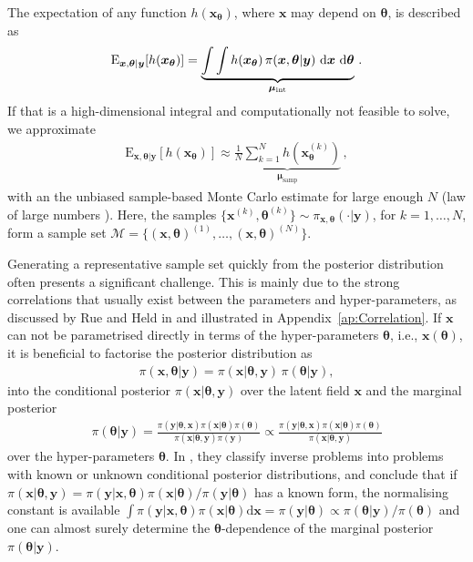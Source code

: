 The expectation of any function $h(\bm{x}_{\bm{\theta}})$, where $\bm{x}$ may depend on $\bm{\theta}$, is described as 
\begin{align}
	\text{E}_{\bm{x},\bm{\theta}|\bm{y}} [h(\bm{x}_{\bm{\theta}})] =  \underbrace{\int \int   h(\bm{x}_{\bm{\theta}}) \,  \pi(\bm{x}, \bm{\theta} | \bm{y} ) \, \mathop{}\!\mathrm{d} \bm{x}  \, \mathop{}\!\mathrm{d} \bm{\theta}}_{\bm{\mu}_{\text{int}}}   \label{eq:expPos} \, .
\end{align}
If that is a high-dimensional integral and computationally not feasible to solve, we approximate 
\begin{align}
	\label{eq:sampMean}
	\text{E}_{\bm{x},\bm{\theta}|\bm{y}} [h(\bm{x}_{\bm{\theta}})] \approx \underbrace{ \frac{1}{N} \sum_{k=1}^{N} h(\bm{x}^{(k)}_{\bm{\theta}})  }_{\bm{\mu}_{\text{samp}}} \, ,
\end{align}
with an the unbiased sample-based Monte Carlo estimate \cite{roberts2004general} for large enough $N$ (law of large numbers \cite[Chapter 17]{tweedie2009measprob}).
Here, the samples $\{\bm{x}^{(k)},\bm{\theta}^{(k)} \}\sim \pi_{\bm{x}, \bm{\theta}}(\cdot|\bm{y})$, for $k = 1, \dots, N$, form a sample set $\mathcal{M} =\{ (\bm{x},\bm{\theta})^{(1)}, \dots ,  (\bm{x},\bm{\theta})^{(N)} \}$.

Generating a representative sample set quickly from the posterior distribution often presents a significant challenge. This is mainly due to the strong correlations that usually exist between the parameters and hyper-parameters, as discussed by Rue and Held in \cite{rue2005gaussian} and illustrated in Appendix~\ref{ap:Correlation}.
If $\bm{x}$ can not be parametrised directly in terms of the hyper-parameters $\bm{\theta}$, i.e., $\bm{x}(\bm{\theta})$, it is beneficial to factorise the posterior distribution as
\begin{align}
	\pi(\bm{x}, \bm{\theta} |  \bm{y}) = \pi(\bm{x} |  \bm{\theta}, \bm{y}) \, \pi(\bm{\theta} |   \bm{y}), \label{eq:MTC}
\end{align}
into the conditional posterior $\pi(\bm{x} |  \bm{\theta}, \bm{y})$ over the latent field $\bm{x}$ and the marginal posterior 
\begin{align}
	\pi(\bm{\theta} |   \bm{y}) =  \frac{ \pi(   \bm{y} | \bm{\theta} ,\bm{x})  \pi( \bm{x} | \bm{\theta} )  \pi(\bm{\theta}) }{ \pi(\bm{x} | \bm{\theta} ,   \bm{y})   \pi( \bm{y})} \propto \frac{ \pi(   \bm{y} | \bm{\theta} ,\bm{x})  \pi( \bm{x} | \bm{\theta} )  \pi(\bm{\theta}) }{ \pi(\bm{x} | \bm{\theta} ,   \bm{y}) } \label{eq:margGen}
\end{align}
over the hyper-parameters $\bm{\theta}$.
In \cite{norton2018sampling}, they classify inverse problems into problems with known or unknown conditional posterior distributions, and conclude that if $\pi(\bm{x} | \bm{\theta} ,   \bm{y}) = \pi(\bm{y} | \bm{x}, \bm{\theta} ) \pi(\bm{x}| \bm{\theta})  / \pi(   \bm{y}| \bm{\theta})$ has a known form, the normalising constant is available \newline $\int \pi(\bm{y} | \bm{x}, \bm{\theta} ) \pi(\bm{x}| \bm{\theta}) \text{d} \bm{x} = \pi(   \bm{y}| \bm{\theta})  \propto \pi( \bm{\theta}|\bm{y}) / \pi(\bm{\theta})$ and one can almost surely determine the $\bm{\theta}$-dependence of the marginal posterior $\pi(\bm{\theta} |   \bm{y})$.

